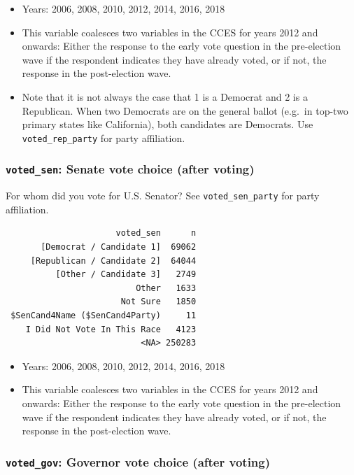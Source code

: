 \documentclass[10pt,article,oneside]{memoir}
\theoremstyle{definition}
\begin{document}
\begin{itemize}
\tightlist
\item
  Years: 2006, 2008, 2010, 2012, 2014, 2016, 2018
\item
  This variable coalesces two variables in the CCES for years 2012 and
  onwards: Either the response to the early vote question in the
  pre-election wave if the respondent indicates they have already voted,
  or if not, the response in the post-election wave.
\item
  Note that it is not always the case that 1 is a Democrat and 2 is a
  Republican. When two Democrats are on the general ballot (e.g.~in
  top-two primary states like California), both candidates are
  Democrats. Use \texttt{voted\_rep\_party} for party affiliation.
\end{itemize}

\hypertarget{voted_sen-senate-vote-choice-after-voting}{%
\subsubsection{\texorpdfstring{\texttt{voted\_sen}: Senate vote choice
(after
voting)}{voted\_sen: Senate vote choice (after voting)}}\label{voted_sen-senate-vote-choice-after-voting}}

For whom did you vote for U.S. Senator? See \texttt{voted\_sen\_party}
for party affiliation.

\begin{verbatim}
                      voted_sen      n
       [Democrat / Candidate 1]  69062
     [Republican / Candidate 2]  64044
          [Other / Candidate 3]   2749
                          Other   1633
                       Not Sure   1850
 $SenCand4Name ($SenCand4Party)     11
    I Did Not Vote In This Race   4123
                           <NA> 250283
\end{verbatim}

\begin{itemize}
\tightlist
\item
  Years: 2006, 2008, 2010, 2012, 2014, 2016, 2018
\item
  This variable coalesces two variables in the CCES for years 2012 and
  onwards: Either the response to the early vote question in the
  pre-election wave if the respondent indicates they have already voted,
  or if not, the response in the post-election wave.
\end{itemize}

\hypertarget{voted_gov-governor-vote-choice-after-voting}{%
\subsubsection{\texorpdfstring{\texttt{voted\_gov}: Governor vote choice
(after
voting)}{voted\_gov: Governor vote choice (after voting)}}\label{voted_gov-governor-vote-choice-after-voting}}
\end{document}
